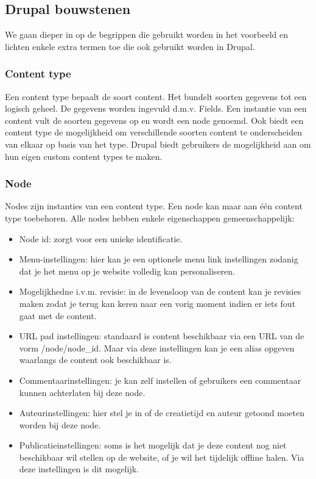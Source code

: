 \subsection{Drupal bouwstenen}

We gaan dieper in op de begrippen die gebruikt worden in het voorbeeld en lichten enkele extra termen toe die ook gebruikt worden in Drupal.

\subsubsection{Content type}
Een content type bepaalt de soort content. Het bundelt soorten gegevens tot een logisch geheel. De gegevens worden ingevuld d.m.v. Fields. Een instantie van een content vult de soorten gegevens op en wordt een node genoemd. Ook biedt een content type de mogelijkheid om verschillende soorten content te onderscheiden van elkaar op basis van het type.
Drupal biedt gebruikers de mogelijkheid aan om hun eigen custom content types te maken.

\subsubsection{Node}
Nodes zijn instanties van een content type. Een node kan maar aan \'{e}\'{e}n content type toebehoren.
Alle nodes hebben enkele eigenschappen gemeenschappelijk:
\begin{itemize}
\item Node id: zorgt voor een unieke identificatie.
\item Menu-instellingen: hier kan je een optionele menu link instellingen zodanig dat je het menu op je website volledig kan personaliseren.
\item Mogelijkhedne i.v.m. revisie: in de levensloop van de content kan je revisies maken zodat je terug kan keren naar een vorig moment indien er iets fout gaat met de content.
\item URL pad instellingen: standaard is content beschikbaar via een URL van de vorm /node/node\_id. Maar via deze instellingen kan je een alias opgeven waarlangs de content ook beschikbaar is.
\item Commentaarinstellingen: je kan zelf instellen of gebruikers een commentaar kunnen achterlaten bij deze node.
\item Auteurinstellingen: hier stel je in of de creatietijd en auteur getoond moeten worden bij deze node.
\item Publicatieinstellingen: soms is het mogelijk dat je deze content nog niet beschikbaar wil stellen op de website, of je wil het tijdelijk offline halen. Via deze instellingen is dit mogelijk.
\end{itemize}

